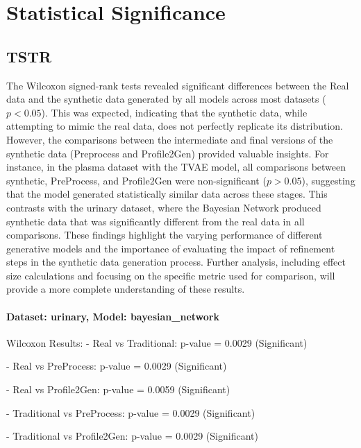 \documentclass{article}
\theoremstyle{plain}
\theoremstyle{definition}
\theoremstyle{remark}
\begin{document}

\section{Statistical Significance}\label{sec:stats_app}

\subsection{TSTR}

The Wilcoxon signed-rank tests revealed significant differences between the Real data and the synthetic data generated by all models across most datasets ($p < 0.05$). This was expected, indicating that the synthetic data, while attempting to mimic the real data, does not perfectly replicate its distribution. However, the comparisons between the intermediate and final versions of the synthetic data (Preprocess and Profile2Gen) provided valuable insights. For instance, in the plasma dataset with the TVAE model, all comparisons between synthetic, PreProcess, and Profile2Gen were non-significant ($p > 0.05$), suggesting that the model generated statistically similar data across these stages. This contrasts with the urinary dataset, where the Bayesian Network produced synthetic data that was significantly different from the real data in all comparisons. These findings highlight the varying performance of different generative models and the importance of evaluating the impact of refinement steps in the synthetic data generation process. Further analysis, including effect size calculations and focusing on the specific metric used for comparison, will provide a more complete understanding of these results.


\paragraph{Dataset: urinary, Model: bayesian\_network}
Wilcoxon Results:
- Real vs Traditional: p-value = 0.0029 (Significant)


- Real vs PreProcess: p-value = 0.0029 (Significant)


- Real vs Profile2Gen: p-value = 0.0059 (Significant)


- Traditional vs PreProcess: p-value = 0.0029 (Significant)


- Traditional vs Profile2Gen: p-value = 0.0029 (Significant)
\end{document}
